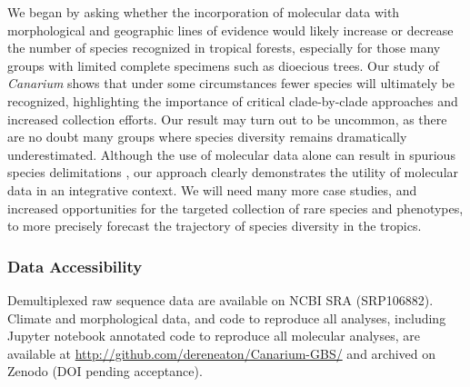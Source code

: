 \documentclass[10pt,letterpaper]{article}
\begin{document}
We began by asking whether the incorporation of molecular data with morphological and geographic lines of evidence would likely increase or decrease the number of species recognized in tropical forests, especially for those many groups with limited complete specimens such as dioecious trees. Our study of \emph{Canarium} shows that under some circumstances fewer species will ultimately be recognized, highlighting the importance of critical clade-by-clade approaches and increased collection efforts. Our result may turn out to be uncommon, as there are no doubt many groups where species diversity remains dramatically underestimated. Although the use of molecular data alone can result in spurious species delimitations \cite{sukumaran_multispecies_2017}, our approach clearly demonstrates the utility of molecular data in an integrative context. We will need many more case studies, and increased opportunities for the targeted collection of rare species and phenotypes, to more precisely forecast the trajectory of species diversity in the tropics.      

\subsubsection*{Data Accessibility}
Demultiplexed raw sequence data are available on NCBI SRA (SRP106882). Climate and morphological data, and code to reproduce all analyses, including Jupyter notebook annotated code to reproduce all molecular analyses, are available at \url{http://github.com/dereneaton/Canarium-GBS/} and archived on Zenodo (DOI pending acceptance).  




\end{document}
